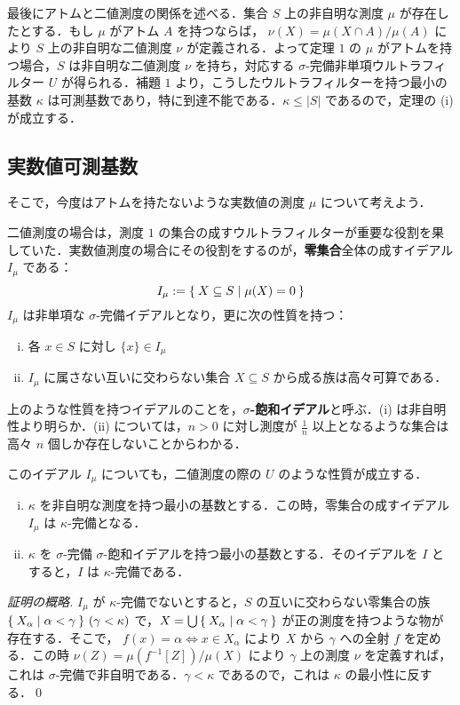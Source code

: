 \documentclass[a4j]{jsarticle}
\begin{document}
最後にアトムと二値測度の関係を述べる．集合 $S$ 上の非自明な測度 $\mu$ が存在したとする．もし $\mu$ がアトム $A$ を持つならば， $\nu(X) = \mu(X \cap A)/\mu(A)$ により $S$ 上の非自明な二値測度 $\nu$ が定義される．よって定理 $1$ の $\mu$ がアトムを持つ場合，$S$ は非自明な二値測度 $\nu$ を持ち，対応する $\sigma$-完備非単項ウルトラフィルター $U$ が得られる．補題 $1$ より，こうしたウルトラフィルターを持つ最小の基数 $\kappa$ は可測基数であり，特に到達不能である．$\kappa \leq |S|$ であるので，定理の (i) が成立する．

\subsection{実数値可測基数}
そこで，今度はアトムを持たないような実数値の測度 $\mu$ について考えよう．

二値測度の場合は，測度 $1$ の集合の成すウルトラフィルターが重要な役割を果していた．実数値測度の場合にその役割をするのが，{\bfseries 零集合}全体の成すイデアル $I_\mu$ である：
\[
 I_\mu \mathrel{:=} \Set{X \subseteq S | \mu(X) = 0}
\]
$I_\mu$ は非単項な $\sigma$-完備イデアルとなり，更に次の性質を持つ：

\begin{enumerate}[(i)]
 \item 各 $x \in S$ に対し $\{x\} \in I_\mu$
       \label{Def:saturate:non-principal}
 \item $I_\mu$ に属さない互いに交わらない集合 $X \subseteq S$ から成る族は高々可算である．
       \label{Def:saturate:disj}
\end{enumerate}

上のような性質を持つイデアルのことを，{\bfseries $\sigma$-飽和イデアル}と呼ぶ．(i) は非自明性より明らか．(ii) については，$n > 0$ に対し測度が $\frac{1}{n}$ 以上となるような集合は高々 $n$ 個しか存在しないことからわかる．

このイデアル $I_\mu$ についても，二値測度の際の $U$ のような性質が成立する．

\begin{lemma}
 \begin{enumerate}[(i)]
  \item $\kappa$ を非自明な測度を持つ最小の基数とする．この時，零集合の成すイデアル $I_\mu$ は $\kappa$-完備となる．
  \item $\kappa$ を $\sigma$-完備 $\sigma$-飽和イデアルを持つ最小の基数とする．そのイデアルを $I$ とすると，$I$ は $\kappa$-完備である．
 \end{enumerate}
\end{lemma}
\begin{proof}[証明の概略]
 $I_\mu$ が $\kappa$-完備でないとすると，$S$ の互いに交わらない零集合の族 $\Set{X_\alpha | \alpha < \gamma}\,(\gamma < \kappa)$ で，$X = \bigcup \Set{X_\alpha | \alpha < \gamma}$ が正の測度を持つような物が存在する．そこで，
 $f(x) = \alpha \Leftrightarrow x \in X_\alpha$
 により $X$ から $\gamma$ への全射 $f$ を定める．この時 $\nu(Z) = \mu(f^{-1}[Z])/\mu(X)$ により $\gamma$ 上の測度 $\nu$ を定義すれば，これは $\sigma$-完備で非自明である．$\gamma < \kappa$ であるので，これは $\kappa$ の最小性に反する．\qed
\end{proof}
\end{document}
